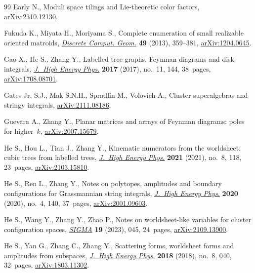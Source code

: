 \documentclass[pdftex]{sigma}
\theoremstyle{definition}
\numberwithin{equation}{section}
\begin{document}
\begin{thebibliography}{99}
Early N., Moduli space tilings and {L}ie-theoretic color factors,
 \href{https://arxiv.org/abs/2310.12130}{arXiv:2310.12130}.

Fukuda K., Miyata H., Moriyama S., Complete enumeration of small realizable
 oriented matroids, \href{https://doi.org/10.1007/s00454-012-9470-0}{\textit{Discrete Comput. Geom.}} \textbf{49} (2013),
 359--381, \href{https://arxiv.org/abs/1204.0645}{arXiv:1204.0645}.

Gao X., He S., Zhang Y., Labelled tree graphs, {F}eynman diagrams and disk
 integrals, \href{https://doi.org/10.1007/jhep11(2017)144}{\textit{J.~High Energy Phys.}} \textbf{2017} (2017), no.~11, 144,
 38~pages, \href{https://arxiv.org/abs/1708.08701}{arXiv:1708.08701}.

Gates Jr. S.J., Mak S.N.H., Spradlin M., Volovich A., Cluster superalgebras and
 stringy integrals, \href{https://arxiv.org/abs/2111.08186}{arXiv:2111.08186}.

Guevara A., Zhang Y., Planar matrices and arrays of {F}eynman diagrams: poles
 for higher~$k$, \href{https://arxiv.org/abs/2007.15679}{arXiv:2007.15679}.

He S., Hou L., Tian J., Zhang Y., Kinematic numerators from the worldsheet:
 cubic trees from labelled trees, \href{https://doi.org/10.1007/jhep08(2021)118}{\textit{J.~High Energy Phys.}} \textbf{2021}
 (2021), no.~8, 118, 23~pages, \href{https://arxiv.org/abs/2103.15810}{arXiv:2103.15810}.

He S., Ren L., Zhang Y., Notes on polytopes, amplitudes and boundary
 configurations for {G}rassmannian string integrals, \href{https://doi.org/10.1007/jhep04(2020)140}{\textit{J.~High Energy
 Phys.}} \textbf{2020} (2020), no.~4, 140, 37~pages, \href{https://arxiv.org/abs/2001.09603}{arXiv:2001.09603}.

He S., Wang Y., Zhang Y., Zhao P., Notes on worldsheet-like variables for
 cluster configuration spaces, \href{https://doi.org/10.3842/SIGMA.2023.045}{\textit{SIGMA}} \textbf{19} (2023), 045,
 24~pages, \href{https://arxiv.org/abs/2109.13900}{arXiv:2109.13900}.

He S., Yan G., Zhang C., Zhang Y., Scattering forms, worldsheet forms and
 amplitudes from subspaces, \href{https://doi.org/10.1007/jhep08(2018)040}{\textit{J.~High Energy Phys.}} \textbf{2018}
 (2018), no.~8, 040, 32~pages, \href{https://arxiv.org/abs/1803.11302}{arXiv:1803.11302}.


\end{thebibliography}
\end{document}
